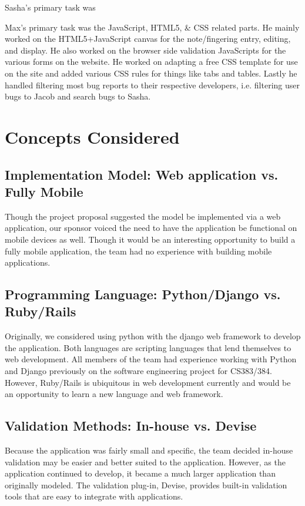 \documentclass[12pt,english]{article}
\begin{document}
Sasha's primary task was

Max's primary task was the JavaScript, HTML5, \& CSS related parts. He mainly worked on the HTML5+JavaScript
canvas for the note/fingering entry, editing, and display. He also worked on the browser side validation JavaScripts for
the various forms on the website. He worked on adapting a free CSS template for use on the site and added various CSS
rules for things like tabs and tables. Lastly he handled filtering most bug reports to their respective developers, i.e. filtering user
bugs to Jacob and search bugs to Sasha.

\section{Concepts Considered}
\subsection{Implementation Model: Web application vs. Fully Mobile}
Though the project proposal suggested the model be implemented via
a web application, our sponsor voiced the need to have the application
be functional on mobile devices as well. Though it would be an interesting
opportunity to build a fully mobile application, the team had no experience
with building mobile applications.

\subsection{Programming Language: Python/Django vs. Ruby/Rails}
Originally, we considered using python with the django web framework
to develop the application. Both languages are scripting languages
that lend themselves to web development. All members of the team had
experience working with Python and Django previously on the software
engineering project for CS383/384. However, Ruby/Rails is ubiquitous
in web development currently and would be an opportunity to learn
a new language and web framework.

\subsection{Validation Methods: In-house vs. Devise}
Because the application was fairly small and specific, the team decided
in-house validation may be easier and better suited to the application.
However, as the application continued to develop, it became a much
larger application than originally modeled. The validation plug-in,
Devise, provides built-in validation tools that are easy to integrate
with applications.
\end{document}
